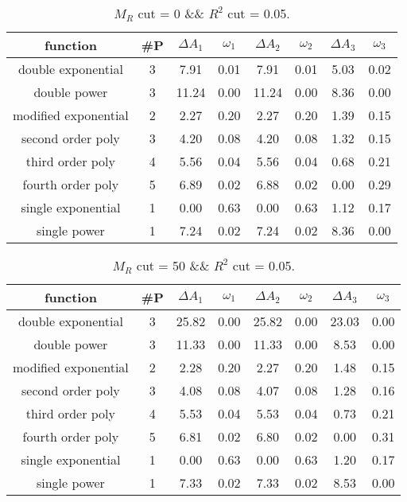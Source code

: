  
\begin{table}[H] 
\begin{center} 
\begin{tabular}{|c|c|cc|cc|cc|} 
\hline function & \#P & $\Delta A_1$ & $\omega_1$ & $\Delta A_2$ & $\omega_2$ & $\Delta A_3$ & $\omega_3$ \\ \hline 
double exponential &  3 &   7.91 &   0.01 &   7.91 &   0.01 &   5.03 &   0.02 \\ 
double power &  3 &  11.24 &   0.00 &  11.24 &   0.00 &   8.36 &   0.00 \\ 
modified exponential &  2 &   2.27 &   0.20 &   2.27 &   0.20 &   1.39 &   0.15 \\ 
second order poly &  3 &   4.20 &   0.08 &   4.20 &   0.08 &   1.32 &   0.15 \\ 
third order poly &  4 &   5.56 &   0.04 &   5.56 &   0.04 &   0.68 &   0.21 \\ 
fourth order poly &  5 &   6.89 &   0.02 &   6.88 &   0.02 &   0.00 &   0.29 \\ 
single exponential &  1 &   0.00 &   0.63 &   0.00 &   0.63 &   1.12 &   0.17 \\ 
single power &  1 &   7.24 &   0.02 &   7.24 &   0.02 &   8.36 &   0.00 \\ 
\hline 
\end{tabular} 
\caption{$M_R$ cut = 0 \&\& $R^2$ cut = 0.05.} 
\label{tab:FitChoices_0_0.05} 
\end{center} 
\end{table} 
 
 
\begin{table}[H] 
\begin{center} 
\begin{tabular}{|c|c|cc|cc|cc|} 
\hline function & \#P & $\Delta A_1$ & $\omega_1$ & $\Delta A_2$ & $\omega_2$ & $\Delta A_3$ & $\omega_3$ \\ \hline 
double exponential &  3 &  25.82 &   0.00 &  25.82 &   0.00 &  23.03 &   0.00 \\ 
double power &  3 &  11.33 &   0.00 &  11.33 &   0.00 &   8.53 &   0.00 \\ 
modified exponential &  2 &   2.28 &   0.20 &   2.27 &   0.20 &   1.48 &   0.15 \\ 
second order poly &  3 &   4.08 &   0.08 &   4.07 &   0.08 &   1.28 &   0.16 \\ 
third order poly &  4 &   5.53 &   0.04 &   5.53 &   0.04 &   0.73 &   0.21 \\ 
fourth order poly &  5 &   6.81 &   0.02 &   6.80 &   0.02 &   0.00 &   0.31 \\ 
single exponential &  1 &   0.00 &   0.63 &   0.00 &   0.63 &   1.20 &   0.17 \\ 
single power &  1 &   7.33 &   0.02 &   7.33 &   0.02 &   8.53 &   0.00 \\ 
\hline 
\end{tabular} 
\caption{$M_R$ cut = 50 \&\& $R^2$ cut = 0.05.} 
\label{tab:FitChoices_50_0.05} 
\end{center} 
\end{table} 
 
